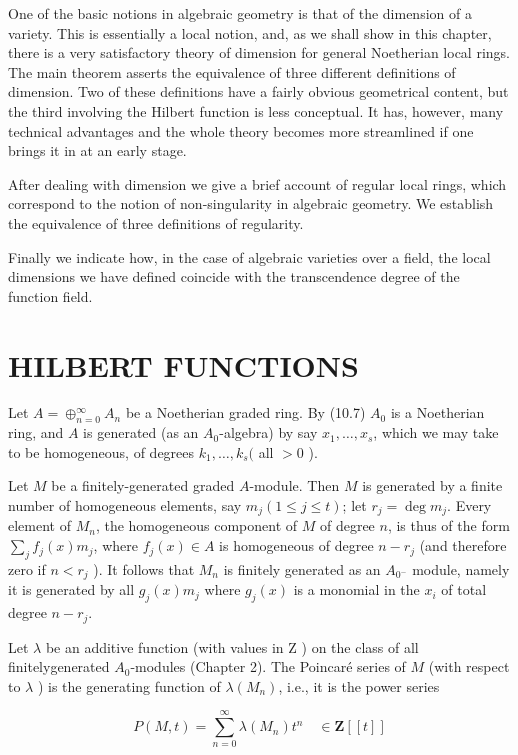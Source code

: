 \documentclass{standalone}
\theoremstyle{definition}
\theoremstyle{remark}
\begin{document}
One of the basic notions in algebraic geometry is that of the dimension of a variety. This is essentially a local notion, and, as we shall show in this chapter, there is a very satisfactory theory of dimension for general Noetherian local rings. The main theorem asserts the equivalence of three different definitions of dimension. Two of these definitions have a fairly obvious geometrical content, but the third involving the Hilbert function is less conceptual. It has, however, many technical advantages and the whole theory becomes more streamlined if one brings it in at an early stage.

After dealing with dimension we give a brief account of regular local rings, which correspond to the notion of non-singularity in algebraic geometry. We establish the equivalence of three definitions of regularity.

Finally we indicate how, in the case of algebraic varieties over a field, the local dimensions we have defined coincide with the transcendence degree of the function field.

\section{HILBERT FUNCTIONS}
Let $A=\oplus_{n=0}^{\infty} A_{n}$ be a Noetherian graded ring. By (10.7) $A_{0}$ is a Noetherian ring, and $A$ is generated (as an $A_{0}$-algebra) by say $x_{1}, \ldots, x_{s}$, which we may take to be homogeneous, of degrees $k_{1}, \ldots, k_{s}($ all $>0$ ).

Let $M$ be a finitely-generated graded $A$-module. Then $M$ is generated by a finite number of homogeneous elements, say $m_{j}(1 \leqslant j \leqslant t)$; let $r_{j}=\operatorname{deg} m_{j}$. Every element of $M_{n}$, the homogeneous component of $M$ of degree $n$, is thus of the form $\sum_{j} f_{j}(x) m_{j}$, where $f_{j}(x) \in A$ is homogeneous of degree $n-r_{j}$ (and therefore zero if $n<r_{j}$ ). It follows that $M_{n}$ is finitely generated as an $A_{0^{-}}$ module, namely it is generated by all $g_{j}(x) m_{j}$ where $g_{j}(x)$ is a monomial in the $x_{i}$ of total degree $n-r_{j}$.

Let $\lambda$ be an additive function (with values in $\mathrm{Z}$ ) on the class of all finitelygenerated $A_{0}$-modules (Chapter 2). The Poincaré series of $M$ (with respect to $\lambda$ ) is the generating function of $\lambda\left(M_{n}\right)$, i.e., it is the power series

\[
P(M, t)=\sum_{n=0}^{\infty} \lambda\left(M_{n}\right) t^{n} \quad \in \mathbf{Z}[[t]]
\]
\end{document}
